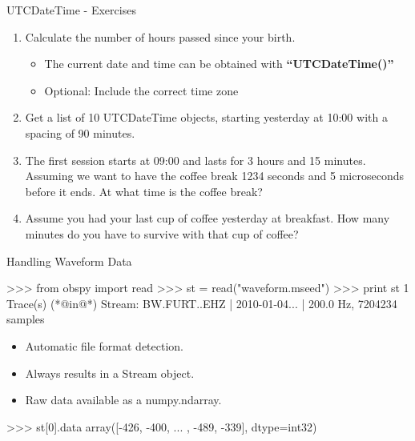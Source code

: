 \documentclass[handout]{beamer}
\begin{document}
\begin{frame}{UTCDateTime - Exercises}
    \begin{enumerate}
        \item Calculate the number of hours passed since your birth. \\
            \begin{itemize}
                \item The current date and time can be obtained with \textbf{``UTCDateTime()''}
                \item Optional: Include the correct time zone
            \end{itemize}
        \item Get a list of 10 UTCDateTime objects, starting yesterday at 10:00 with a spacing of 90 minutes.
        \item The first session starts at 09:00 and lasts for 3 hours and 15
            minutes. Assuming we want to have the coffee break 1234 seconds and
            5 microseconds before it ends. At what time is the coffee break?
        \item Assume you had your last cup of coffee yesterday at breakfast.
            How many minutes do you have to survive with that cup of coffee?
    \end{enumerate}


\end{frame}





\begin{frame}{Handling Waveform Data}
\begin{myColorBox}{0.95}{}
\begin{python}
>>> from obspy import read
>>> st = read("waveform.mseed")
>>> print st
1 Trace(s) (*@in@*) Stream:
BW.FURT..EHZ | 2010-01-04... | 200.0 Hz, 7204234 samples
\end{python}
\end{myColorBox}
\begin{itemize}
    \item Automatic file format detection.
    \item Always results in a Stream object.
    \item Raw data available as a numpy.ndarray.
\end{itemize}
\begin{myColorBox}{0.95}{}
\begin{python}
>>> st[0].data
array([-426, -400, ... , -489, -339], dtype=int32)
\end{python}
\end{myColorBox}
\end{frame}
\end{document}
